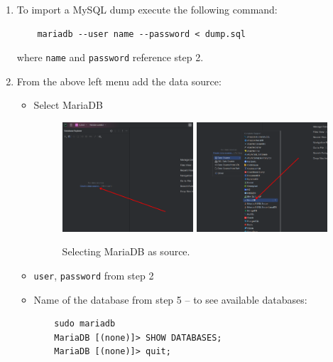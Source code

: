 \begin{enumerate}
  \item To import a MySQL dump execute the following command:
    \begin{verbatim}
    mariadb --user name --password < dump.sql
    \end{verbatim}
    where \texttt{name} and \texttt{password} reference step 2.

    \newpage

  \item From the above left menu add the data source:
    \begin{itemize}
      \item Select MariaDB
        \begin{figure}[H]
          \centering
          \includegraphics[width=0.49\textwidth]{img/datagrip/datagrip_2.png}
          \includegraphics[width=0.49\textwidth]{img/datagrip/datagrip_3.png}
          \caption{Selecting MariaDB as source.}
        \end{figure}
      \item \texttt{user}, \texttt{password} from step 2
      \item Name of the database from step 5 -- to see available databases:
    \begin{verbatim}
    sudo mariadb
    MariaDB [(none)]> SHOW DATABASES;
    MariaDB [(none)]> quit;
    \end{verbatim}
    \end{itemize}
    \begin{figure}[H]

\end{figure}
\end{enumerate}

